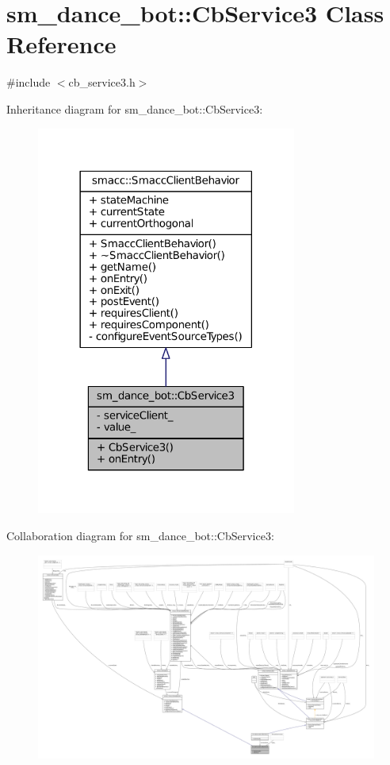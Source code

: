 \hypertarget{classsm__dance__bot_1_1CbService3}{}\section{sm\+\_\+dance\+\_\+bot\+:\+:Cb\+Service3 Class Reference}
\label{classsm__dance__bot_1_1CbService3}


{\ttfamily \#include $<$cb\+\_\+service3.\+h$>$}



Inheritance diagram for sm\+\_\+dance\+\_\+bot\+:\+:Cb\+Service3\+:
\nopagebreak
\begin{figure}[H]
\begin{center}
\leavevmode
\includegraphics[width=242pt]{classsm__dance__bot_1_1CbService3__inherit__graph}
\end{center}
\end{figure}


Collaboration diagram for sm\+\_\+dance\+\_\+bot\+:\+:Cb\+Service3\+:
\nopagebreak
\begin{figure}[H]
\begin{center}
\leavevmode
\includegraphics[width=350pt]{classsm__dance__bot_1_1CbService3__coll__graph}
\end{center}
\end{figure}
